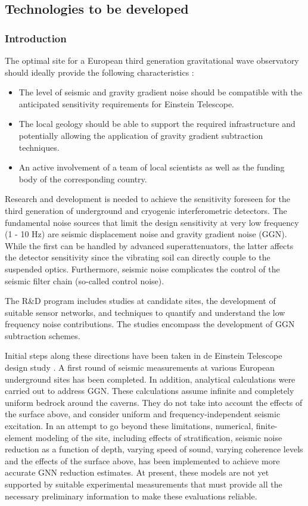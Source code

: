 
\FloatBarrier
\subsection{Technologies to be developed}
\subsubsection{Introduction}
The optimal site for a European third generation gravitational wave observatory should ideally provide the following characteristics \cite{GGCellaCuoco}: 
\begin{itemize}
\item{} The level of seismic and gravity gradient noise should be compatible with the anticipated sensitivity requirements for Einstein Telescope. 
\item{} The local geology should be able to support the required infrastructure and potentially allowing the application of gravity gradient subtraction techniques. 
\item{} An active involvement of a team of local scientists as well as the funding body of the corresponding country. 
\end{itemize}

Research and development is needed to achieve the sensitivity foreseen for the third generation of underground and cryogenic interferometric detectors. The fundamental noise sources that limit the design sensitivity at very low frequency (1 - 10 Hz) are seismic displacement noise and gravity gradient noise (GGN). While the first can be handled by advanced superattenuators, the latter affects the detector sensitivity since the vibrating soil can directly couple to the suspended optics. Furthermore, seismic noise complicates the control of the seismic filter chain (so-called control noise).

The R\&D program includes studies at candidate sites, the development of suitable sensor networks, and techniques to quantify and understand the low frequency noise contributions. The studies encompass the development of GGN subtraction schemes. 

Initial steps along these directions have been taken in de Einstein Telescope design study \cite{ET}. A first round of seismic measurements at various European underground sites has been completed.
In addition, analytical calculations were carried out to address GGN. These calculations assume infinite and completely uniform bedrock around the caverns. They do not take into account the effects of the surface above, and consider uniform 
and frequency-independent seismic excitation. In an attempt to go beyond these limitations, numerical, finite-element modeling of the site, including effects of stratification, seismic noise reduction as a function of depth, varying speed of sound, varying coherence levels and the effects of the surface above, has been implemented to achieve more accurate GNN reduction estimates. At present, these models are not yet supported by suitable experimental measurements that must provide all the necessary preliminary information to make these evaluations reliable.

